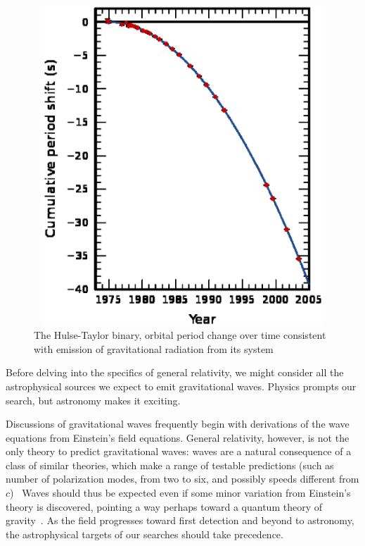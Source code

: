 	\begin{figure}
	\begin{center}
	\includegraphics[height=120mm, width=160mm]{500px-PSR_B1913+16_period_shift_graph.eps}
	\caption{The Hulse-Taylor binary, orbital period change over time consistent with emission of gravitational radiation from its system}
	\label{Hulse-Taylor_binary}
	\end{center}
	\end{figure}

		Before delving into the specifics of general relativity, we might consider all the astrophysical sources we expect to emit gravitational waves. Physics prompts our search, but astronomy makes it exciting.

	Discussions of gravitational waves frequently begin with derivations of the wave equations from Einstein's field equations. 
General relativity, however, is not the only theory to predict gravitational waves: waves are a natural consequence of a class of similar theories, which make a range of testable predictions (such as number of polarization modes, from two to six, and possibly speeds different from $c$)~\cite{Will1993} 
Waves should thus be expected even if some minor variation from Einstein's theory is discovered, pointing a way perhaps toward a quantum theory of gravity~\cite{Sathyaprakash2009}. 
As the field progresses toward first detection and beyond to astronomy, the astrophysical targets of our searches should take precedence.

